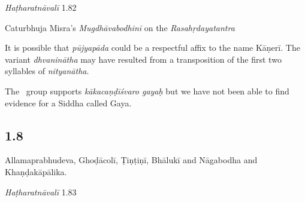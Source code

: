 \begin{ekdosis}
\begin{testimonia}[hp01_007]
\emph{Haṭharatnāvalī} 1.82

\begin{versinnote}
\end{versinnote}

Caturbhuja Misra's \emph{Mugdhāvabodhinī} on the \emph{Rasahṛdayatantra}

\begin{versinnote}
\end{versinnote}

\end{testimonia}

\begin{philcomm}[hp01_007]   
It is possible that \emph{pūjyapāda} could be a respectful affix to the name Kāṇerī. The variant \emph{dhvaninātha} may have resulted from a transposition of the first two syllables of \emph{nityanātha}.    

The \textalpha\ group supports \emph{kākacaṇḍīśvaro gayaḥ} but we have not been able to find evidence for a Siddha called Gaya.
\end{philcomm}

\subsection*{1.8}
\begin{translation}[hp01_008]
Allamaprabhudeva, Ghoḍācolī, Ṭiṇṭiṇī, Bhālukī and Nāgabodha and Khaṇḍakāpālika.
\end{translation}

\begin{testimonia}[hp01_008]
\emph{Haṭharatnāvalī} 1.83

\begin{versinnote}
\tl{\var{allamaḥ prabhudevaś ] allamaprabhudevaś P,T,t1}\\!}
\end{versinnote}


\end{testimonia}
\end{ekdosis}
